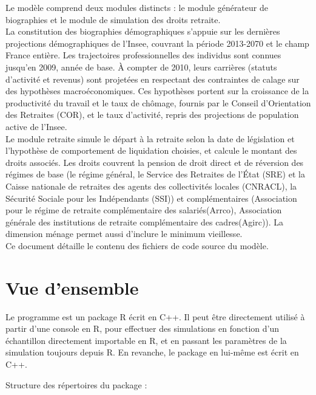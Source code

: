 Le modèle comprend deux modules distincts : le module générateur de biographies et le module de simulation des droits retraite.\\
La constitution des biographies démographiques s'appuie sur les dernières projections démographiques de l'Insee, couvrant la période 2013-2070 et le champ France entière. Les trajectoires professionnelles des individus sont connues jusqu’en 2009, année de base. \`A compter de 2010, leurs carrières (statuts d’activité et revenus) sont projetées en respectant des contraintes de calage sur des hypothèses macroéconomiques. Ces hypothèses portent sur la croissance de la productivité du travail et le taux de chômage, fournis par le Conseil d'Orientation des Retraites (COR), et le taux d'activité, repris des projections de population active de l'Insee.\\
Le module retraite simule le départ à la retraite selon la date de législation et l'hypothèse de comportement de liquidation choisies, et calcule le montant des droits associés. Les droits couvrent la pension de droit direct et de réversion des régimes de base (le régime général, le Service des Retraites de l'État (SRE) et la Caisse nationale de retraites des agents des collectivités locales (CNRACL), la Sécurité Sociale pour les Indépendants (SSI)) et complémentaires (Association pour le régime de retraite complémentaire des salariés(Arrco), Association générale des institutions de retraite complémentaire des cadres(Agirc)). La dimension ménage permet aussi d'inclure le minimum vieillesse.\\
Ce document détaille le contenu des fichiers de code source du modèle. 



\section{Vue d'ensemble}

Le programme est un package R écrit en C++. Il peut
être directement utilisé à partir d'une console en R, 
pour effectuer des simulations en fonction d'un échantillon
directement importable en R, et en passant les paramètres de la simulation
toujours depuis R. En revanche, le package en lui-même est écrit en C++. 

Structure des répertoires du package :

